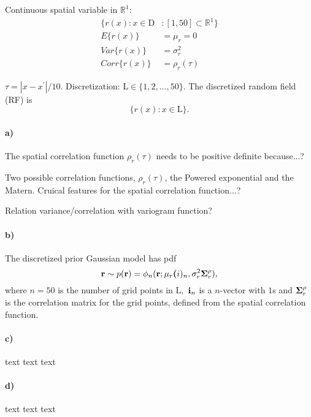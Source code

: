Continuous spatial variable in $\mathbb{R}^1$: 
\begin{align*}
    \{r(x): x \in \text{D} &: [1,50] \subset \mathbb{R}^1\} \\
    E\{r(x)\} &= \mu_r = 0\\
    Var\{r(x)\} & = \sigma_r^2 \\
    Corr\{r(x)\} & = \rho_r(\tau)
\end{align*}

$\tau = |x-x^\prime|/10.$ 
Discretization: $\text{L} \in \{1,2,...,50\}$.
The discretized random field (RF) is 
\begin{equation*}
    \{r(x): x \in \text{L}\}.
\end{equation*}

\paragraph{a)}
 The spatial correlation function $\rho_r(\tau)$ needs to be positive definite because...?

Two possible correlation functions, $\rho_r(\tau)$, the Powered exponential and the Matern. Cruical features for the spatial correlation function...?

Relation variance/correlation with variogram function?

\paragraph{b)}
The discretized prior Gaussian model has pdf
\begin{equation}
    \boldsymbol{\mathbf{r}} \sim p(\boldsymbol{\mathbf{r}}) = \phi_n(\boldsymbol{\mathbf{r}}; \mu_r \boldsymbol{\mathbf{(}}i)_n, \sigma_r^2\boldsymbol{\mathbf{\Sigma}}_r^{\rho}),
\end{equation}
where $n = 50$ is the number of grid points in $\text{L},$ $\boldsymbol{\mathbf{i}}_n$ is a $n$-vector with $1$s and $\boldsymbol{\mathbf{\Sigma}}_r^{\rho}$ is the correlation matrix for the grid points, defined from the spatial correlation function.

\paragraph{c)}
text text text

\paragraph{d)}
text text text

